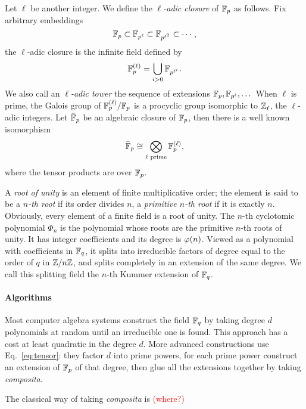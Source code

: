 \documentclass{sig-alternate}
\newcommand{\todo}[1]{\textcolor{red}{(#1)}}
\newcommand{\Cyc}{\Phi}  %
\begin{document}
Let $\ell$ be another integer. We define the \emph{$\ell$-adic
  closure} of $\mathbb{F}_p$ as follows. Fix arbitrary embeddings
\begin{equation*}
  \mathbb{F}_p \subset \mathbb{F}_{p^\ell} \subset \mathbb{F}_{p^{\ell^2}} \subset \cdots,
\end{equation*}
the $\ell$-adic closure is the infinite field defined by
\begin{equation*}
  \mathbb{F}_p^{(\ell)} = \bigcup_{i>0}\mathbb{F}_{p^{\ell^i}}.
\end{equation*}
We also call an \emph{$\ell$-adic tower} the sequence of extensions
$\mathbb{F}_p,\mathbb{F}_{p^\ell},\dots$ When $\ell$ is prime, the Galois group of
$\mathbb{F}_p^{(\ell)}/\mathbb{F}_p$ is a procyclic group isomorphic to $\mathbb{Z}_\ell$, the
$\ell$-adic integers. Let $\bar{\mathbb{F}}_p$ be an algebraic closure of
$\mathbb{F}_p$, then there is a well known isomorphism
\begin{equation}
  \label{eq:tensor}
  \bar{\mathbb{F}}_p \cong \bigotimes_{\ell\text{ prime}} \mathbb{F}_p^{(\ell)},
\end{equation}
where the tensor products are over $\mathbb{F}_p$.

A \emph{root of unity} is an element of finite multiplicative order;
the element is said to be a \emph{$n$-th root} if its order divides
$n$, a \emph{primitive $n$-th root} if it is exactly $n$. Obviously,
every element of a finite field is a root of unity. The $n$-th
cyclotomic polynomial $\Cyc_n$ is the polynomial whose roots are the
primitive $n$-th roots of unity. It has integer coefficients and its
degree is $\varphi(n)$. Viewed as a polynomial with coefficients in $\mathbb{F}_q$,
it splits into irreducible factors of degree equal to the order of $q$
in $\mathbb{Z}/n\mathbb{Z}$, and splits completely in an extension of the same
degree. We call this splitting field the $n$-th Kummer extension of
$\mathbb{F}_q$.

\paragraph{Algorithms}
Most computer algebra systems construct the field $\mathbb{F}_q$ by taking
degree $d$ polynomials at random until an irreducible one is
found. This approach has a cost at least quadratic in the degree
$d$. More advanced constructions use Eq.~\eqref{eq:tensor}: they
factor $d$ into prime powers, for each prime power construct an
extension of $\mathbb{F}_p$ of that degree, then glue all the extensions
together by taking \emph{composita}.

The classical way of taking \emph{composita} is \todo{where?}
\end{document}
